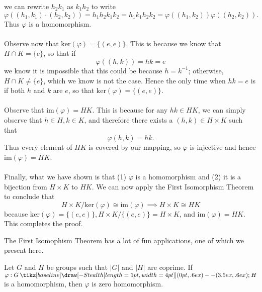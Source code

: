 \documentclass[12pt,letterpaper]{algebra_book}
\renewcommand{\to}{\mathbin{\tikz[baseline] \draw[-{Stealth[length=5pt,width=4pt]}] (0pt,.6ex) -- (3.5ex,.6ex);}}
\renewcommand{\phi}{\varphi}
\theoremstyle{definition}
\begin{document}
\begin{prf}
\begin{itemize}
            we can rewrite $h_2k_1$ as $k_1h_2$ to write 
            $$
            \phi((h_1, k_1)\cdot(h_2, k_2)) =  h_1h_2k_1k_2
            = h_1k_1h_2k_2 = \phi((h_1, k_2))\phi((h_2, k_2)).
            $$
            Thus $\phi$ is a homomorphism. \\
            \\
            Observe now that $\text{ker}(\phi) = \{(e, e)\}$. This is because we 
            know that $H \cap K = \{e\}$, so that if 
            $$
            \phi((h, k)) = hk = e
            $$
            we know it is impossible that this could be because $h = k^{-1}$; otherwise, 
            $H \cap K \ne \{e\}$, which we know is not the case. 
            Hence the only time when $hk = e$ is if both $h$ and $k$ 
            are $e$, so that $\text{ker}(\phi) = \{(e, e)\}$.
            \\
            \\
            Observe that $\text{im}(\phi) = HK$. This is because for any $hk \in 
            HK$, we can simply observe that $h \in H, k \in K$, and therefore there 
            exists a $(h, k) \in H \times K$ such that 
            $$
            \phi(h, k) = hk.
            $$
            Thus every element of $HK$ is covered by our mapping, so $\phi$ is injective 
            and hence $\text{im}(\phi) = HK$.
            \\
            \\
            Finally, what we have shown is that (1) $\phi$ is a homomorphism and 
            (2) it is a bijection from $H \times K$ to $HK$. We can now apply the 
            First Isomorphism Theorem to conclude that 
            $$ 
            H \times K/\text{ker}(\phi) \cong \text{im}(\phi) \implies H\times K \cong HK
            $$
            because $\text{ker}(\phi) = \{(e, e)\}, H \times K/\{(e, e)\} = H \times K$, 
            and $\text{im}(\phi) = HK$. This completes the proof.
        \end{itemize}
    \end{prf}

    The First Isomophism Theorem has a lot of fun applications, one of
    which we present here. 

    \begin{thm}
        Let $G$ and $H$ be groups such that $|G|$ and $|H|$ are
        coprime. If $\phi: G \to H$ is a homomorphism, then $\phi$ is
        zero homomorphism. 
    \end{thm}
\end{document}
